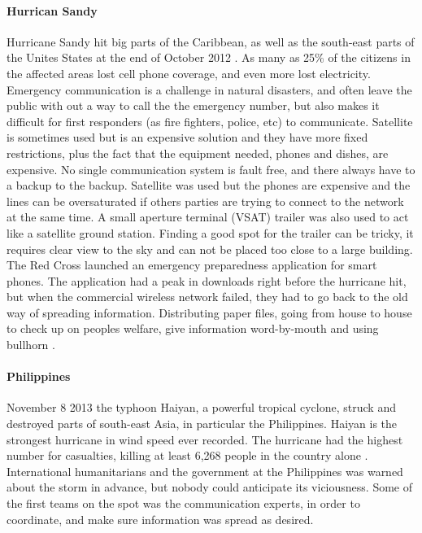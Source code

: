 \paragraph{Hurrican Sandy}
Hurricane Sandy hit big parts of the Caribbean, as well as the south-east parts of the Unites States at the end of October 2012 \cite{WikiSandy}. As many as 25\% of the citizens in the affected areas lost cell phone coverage, and even more lost electricity. Emergency communication is a challenge in natural disasters, and often leave the public with out a way to call the the emergency number, but also makes it difficult for first responders (as fire fighters, police, etc) to communicate.  Satellite is sometimes used but is an expensive solution and they have more fixed restrictions, plus the fact that the equipment needed, phones and dishes, are expensive. No single communication system is fault free, and there always have to a backup to the backup. Satellite was used but the phones are expensive and the lines can be oversaturated if others parties are trying to connect to the network at the same time. A small aperture terminal (VSAT) trailer was also used to act like a satellite ground station. Finding a good spot for the trailer can be tricky, it requires clear view to the sky and can not be placed too close to a large building. The Red Cross launched an emergency preparedness application for smart phones. The application had a peak in downloads right before the hurricane hit, but when the commercial wireless network failed, they had to go back to the old way of spreading information. Distributing paper files, going from house to house to check up on peoples welfare, give information word-by-mouth and using bullhorn \cite{hurricaneSandy}.

\paragraph{Philippines}
November 8 2013 the typhoon Haiyan, a powerful tropical cyclone, struck and destroyed parts of south-east Asia, in particular the Philippines. Haiyan is the strongest hurricane in wind speed ever recorded. The hurricane had the highest number for casualties, killing at least 6,268 people in the country alone \cite{wikiHaiyan}. International humanitarians and the government at the Philippines was warned about the storm in advance, but nobody could anticipate its viciousness. Some of the first teams on the spot was the communication experts, in order to coordinate, and make sure information was spread as desired.    \cite{disasterResponse} 

